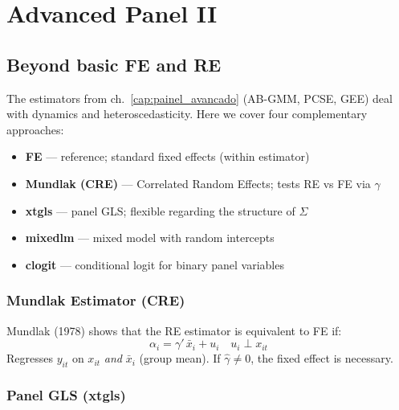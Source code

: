 \chapter{Advanced Panel II}
\label{cap:painel2}

\section{Beyond basic FE and RE}

The estimators from ch.~\ref{cap:painel_avancado} (AB-GMM, PCSE, GEE) deal
with dynamics and heteroscedasticity. Here we cover four complementary approaches:

\begin{itemize}
  \item \textbf{FE} — reference; standard fixed effects (within estimator)
  \item \textbf{Mundlak (CRE)} — Correlated Random Effects; tests RE vs FE via $\gamma$
  \item \textbf{xtgls} — panel GLS; flexible regarding the structure of $\Sigma$
  \item \textbf{mixedlm} — mixed model with random intercepts
  \item \textbf{clogit} — conditional logit for binary panel variables
\end{itemize}

\subsection*{Mundlak Estimator (CRE)}

Mundlak (1978) shows that the RE estimator is equivalent to FE if:
\[
  \alpha_i = \gamma'\,\bar{x}_i + u_i \quad u_i \perp x_{it}
\]
Regresses $y_{it}$ on $x_{it}$ \emph{and} $\bar{x}_i$ (group mean).
If $\hat{\gamma} \neq 0$, the fixed effect is necessary.

\subsection*{Panel GLS (xtgls)}

